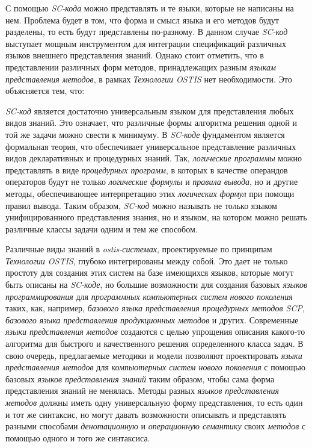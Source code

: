 С помощью \textit{SC-кода} можно представлять и те языки, которые не написаны на нем. Проблема будет в том, что форма и смысл языка и его методов будут разделены, то есть будут представлены по-разному. В данном случае \textit{SC-код} выступает мощным инструментом для интеграции спецификаций различных языков внешнего представления знаний. Однако стоит отметить, что в представлении различных форм методов, принадлежащих разным \textit{языкам представления методов}, в рамках \textit{Технологии OSTIS} нет необходимости. Это объясняется тем, что:
\begin{textitemize}
    \item \textit{SC-код} является достаточно универсальным языком для представления любых видов знаний. Это означает, что различные формы алгоритма решения одной и той же задачи можно свести к минимуму. В \textit{SC-коде} фундаментом является формальная теория, что обеспечивает универсальное представление различных видов декларативных и процедурных знаний. Так, \textit{логические программы} можно представлять в виде \textit{процедурных программ}, в которых в качестве операндов операторов будут не только \textit{логические формулы} и \textit{правила вывода}, но и другие методы, обеспечивающее интерпретацию этих \textit{логических формул} при помощи правил вывода. Таким образом, \textit{SC-код} можно называть не только языком унифицированного представления знания, но и языком, на котором можно решать различные классы задачи одним и тем же способом.
    \item Различные виды знаний в \textit{ostis-системах}, проектируемые по принципам \textit{Технологии OSTIS}, глубоко интегрированы между собой. Это дает не только простоту для создания этих систем на базе имеющихся языков, которые могут быть описаны на \textit{SC-коде}, но большие возможности для создания базовых \textit{языков программирования} для \textit{программных компьютерных систем нового поколения} таких, как, например, \textit{базового языка представления процедурных методов SCP}, \textit{базового языка представления продукционных методов} и других. Современные \textit{языки представления методов} создаются с целью упрощения описания какого-то алгоритма для быстрого и качественного решения определенного класса задач. В свою очередь, предлагаемые методики и модели позволяют проектировать \textit{языки представления методов} для \textit{компьютерных систем нового поколения} с помощью базовых \textit{языков представления знаний} таким образом, чтобы сама форма представления знаний не менялась. Методы разных \textit{языков представления методов} должны иметь одну универсальную форму представления, то есть один и тот же синтаксис, но могут давать возможности описывать и представлять разными способами \textit{денотационную} и \textit{операционную семантику} своих \textit{методов} с помощью одного и того же синтаксиса.

\end{textitemize}
